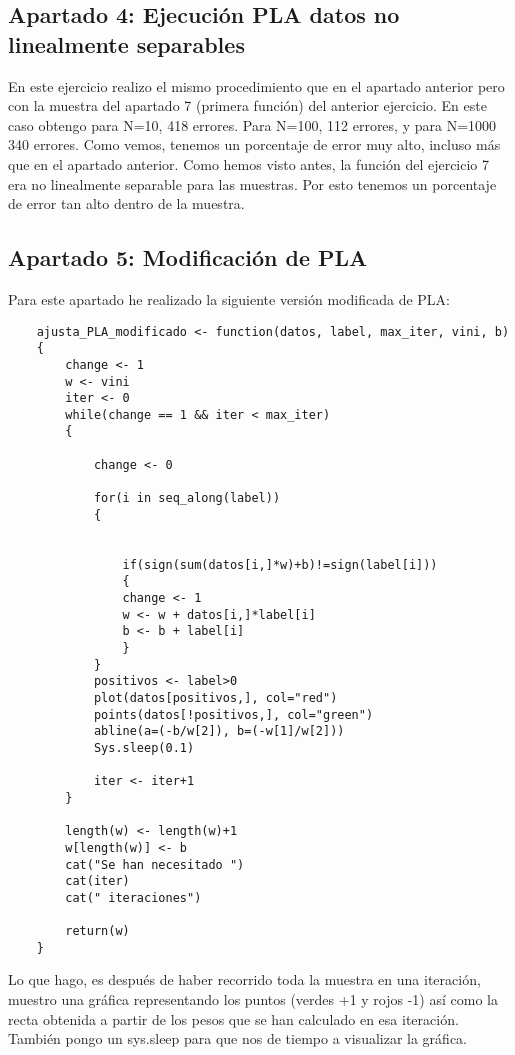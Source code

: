 \subsection{Apartado 4: Ejecución PLA datos no linealmente separables}
En este ejercicio realizo el mismo procedimiento que en el apartado anterior pero con la muestra del apartado 7 (primera función) del anterior ejercicio. En este caso obtengo para N=10, 418 errores. Para N=100, 112 errores, y para N=1000 340 errores. Como vemos, tenemos un porcentaje de error muy alto, incluso más que en el apartado anterior. Como hemos visto antes, la función del ejercicio 7 era no linealmente separable para las muestras. Por esto tenemos un porcentaje de error tan alto dentro de la muestra.

\subsection{Apartado 5: Modificación de PLA}
Para este apartado he realizado la siguiente versión modificada de PLA:
\newpage

	\begin{lstlisting}
	ajusta_PLA_modificado <- function(datos, label, max_iter, vini, b)
	{
		change <- 1
		w <- vini
		iter <- 0
		while(change == 1 && iter < max_iter)
		{  
		
			change <- 0
			
			for(i in seq_along(label))
			{
			
			
				if(sign(sum(datos[i,]*w)+b)!=sign(label[i]))
				{
				change <- 1
				w <- w + datos[i,]*label[i]
				b <- b + label[i]
				}
			}
			positivos <- label>0
			plot(datos[positivos,], col="red")
			points(datos[!positivos,], col="green")
			abline(a=(-b/w[2]), b=(-w[1]/w[2]))
			Sys.sleep(0.1)
			
			iter <- iter+1
		}
		
		length(w) <- length(w)+1
		w[length(w)] <- b
		cat("Se han necesitado ")
		cat(iter)
		cat(" iteraciones")
		
		return(w)
	}
	\end{lstlisting}
	
	Lo que hago, es después de haber recorrido toda la muestra en una iteración, muestro una gráfica representando los puntos (verdes +1 y rojos -1) así como la recta obtenida a partir de los pesos que se han calculado en esa iteración. También pongo un sys.sleep para que nos de tiempo a visualizar la gráfica.
	\\
	\\
	

